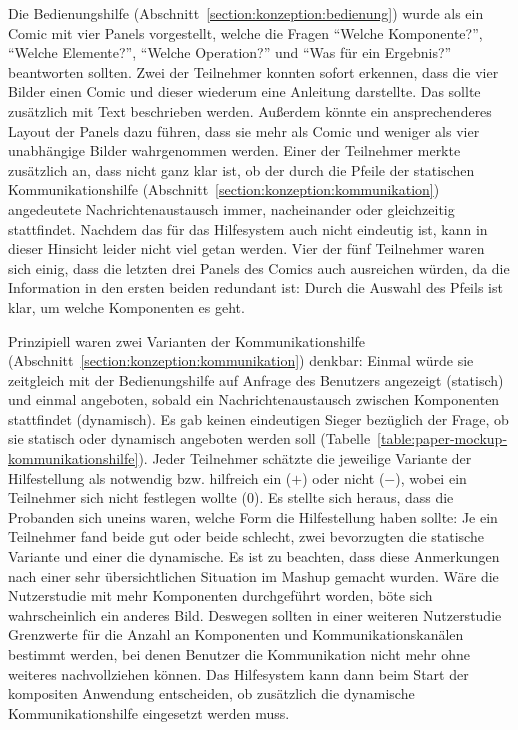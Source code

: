 \documentclass[
	headsepline,
	footsepline,
	fontsize=12pt,
	bibliography=totoc
]{scrbook}
\begin{document}
Die Bedienungshilfe (Abschnitt~\ref{section:konzeption:bedienung}) wurde als ein Comic mit vier Panels vorgestellt, welche die Fragen \enquote{Welche Komponente?}, \enquote{Welche Elemente?}, \enquote{Welche Operation?} und \enquote{Was für ein Ergebnis?} beantworten sollten. Zwei der Teilnehmer konnten sofort erkennen, dass die vier Bilder einen Comic und dieser wiederum eine Anleitung darstellte. Das sollte zusätzlich mit Text beschrieben werden. Außerdem könnte ein ansprechenderes Layout der Panels dazu führen, dass sie mehr als Comic und weniger als vier unabhängige Bilder wahrgenommen werden. Einer der Teilnehmer merkte zusätzlich an, dass nicht ganz klar ist, ob der durch die Pfeile der statischen Kommunikationshilfe (Abschnitt~\ref{section:konzeption:kommunikation}) angedeutete Nachrichtenaustausch immer, nacheinander oder gleichzeitig stattfindet. Nachdem das für das Hilfesystem auch nicht eindeutig ist, kann in dieser Hinsicht leider nicht viel getan werden. Vier der fünf Teilnehmer waren sich einig, dass die letzten drei Panels des Comics auch ausreichen würden, da die Information in den ersten beiden redundant ist: Durch die Auswahl des Pfeils ist klar, um welche Komponenten es geht.

Prinzipiell waren zwei Varianten der Kommunikationshilfe (Abschnitt~\ref{section:konzeption:kommunikation}) denkbar: Einmal würde sie zeitgleich mit der Bedienungshilfe auf Anfrage des Benutzers angezeigt (statisch) und einmal angeboten, sobald ein Nachrichtenaustausch zwischen Komponenten stattfindet (dynamisch). Es gab keinen eindeutigen Sieger bezüglich der Frage, ob sie statisch oder dynamisch angeboten werden soll (Tabelle~\ref{table:paper-mockup-kommunikationshilfe}). Jeder Teilnehmer schätzte die jeweilige Variante der Hilfestellung als notwendig bzw. hilfreich ein ($+$) oder nicht ($-$), wobei ein Teilnehmer sich nicht festlegen wollte (0). Es stellte sich heraus, dass die Probanden sich uneins waren, welche Form die Hilfestellung haben sollte: Je ein Teilnehmer fand beide gut oder beide schlecht, zwei bevorzugten die statische Variante und einer die dynamische. Es ist zu beachten, dass diese Anmerkungen nach einer sehr übersichtlichen Situation im Mashup gemacht wurden. Wäre die Nutzerstudie mit mehr Komponenten durchgeführt worden, böte sich wahrscheinlich ein anderes Bild. Deswegen sollten in einer weiteren Nutzerstudie Grenzwerte für die Anzahl an Komponenten und Kommunikationskanälen bestimmt werden, bei denen Benutzer die Kommunikation nicht mehr ohne weiteres nachvollziehen können. Das Hilfesystem kann dann beim Start der kompositen Anwendung entscheiden, ob zusätzlich die dynamische Kommunikationshilfe eingesetzt werden muss.
\end{document}
